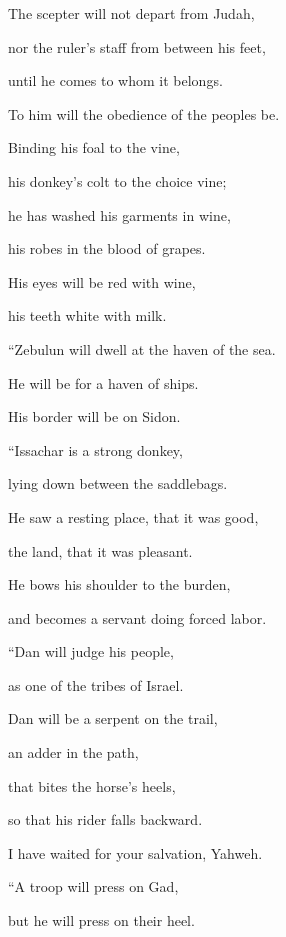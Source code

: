 {\par }{\Q {}The scepter will not depart from Judah,
\par }{\QB nor the ruler’s staff from between his feet,
\par }{\Q until he comes to whom it belongs.
\par }{\QB To him will the obedience of the peoples be.
\par }{\Q {}Binding his foal to the vine,
\par }{\QB his donkey’s colt to the choice vine;
\par }{\Q he has washed his garments in wine,
\par }{\QB his robes in the blood of grapes.
\par }{\Q {}His eyes will be red with wine,
\par }{\QB his teeth white with milk.
\par }{\BB \par }{\Q {}“Zebulun will dwell at the haven of the sea.
\par }{\QB He will be for a haven of ships.
\par }{\QB His border will be on Sidon.
\par }{\BB \par }{\Q {}“Issachar is a strong donkey,
\par }{\QB lying down between the saddlebags.
\par }{\Q {}He saw a resting place, that it was good,
\par }{\QB the land, that it was pleasant.
\par }{\Q He bows his shoulder to the burden,
\par }{\QB and becomes a servant doing forced labor.
\par }{\BB \par }{\Q {}“Dan will judge his people,
\par }{\QB as one of the tribes of Israel.
\par }{\Q {}Dan will be a serpent on the trail,
\par }{\QB an adder in the path,
\par }{\Q that bites the horse’s heels,
\par }{\QB so that his rider falls backward.
\par }{\Q {}I have waited for your salvation, Yahweh.
\par }{\BB \par }{\Q {}“A troop will press on Gad,
\par }{\QB but he will press on their heel.
}
